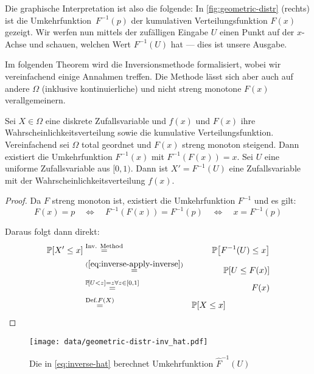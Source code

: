 Die graphische Interpretation ist also die folgende:
In \cref{fig:geometric-distr} (rechts) ist die Umkehrfunktion~$F^{-1}(p)$ der kumulativen Verteilungsfunktion $F(x)$ gezeigt.
Wir werfen nun mittels der zufälligen Eingabe $U$ einen Punkt auf der $x$-Achse und schauen, welchen Wert $F^{-1}(U)$ hat --- dies ist unsere Ausgabe.

Im folgenden Theorem wird die Inversionsmethode formalisiert, wobei wir vereinfachend einige Annahmen treffen.
Die Methode lässt sich aber auch auf andere $\Omega$ (inklusive kontinuierliche) und nicht streng monotone $F(x)$ verallgemeinern.

\begin{theorem}
    Sei $X \in \Omega$ eine diskrete Zufallsvariable und $f(x)$ und $F(x)$ ihre Wahrscheinlichkeitsverteilung sowie die kumulative Verteilungsfunktion.
    Vereinfachend sei $\Omega$ total geordnet und $F(x)$ streng monoton steigend.
    Dann existiert die Umkehrfunktion $F^{-1}(x)$ mit $F^{-1}(F(x)) = x$.
    Sei $U$ eine uniforme Zufallsvariable aus $[0, 1)$.
    Dann ist $X' = F^{-1}(U)$ eine Zufallsvariable mit der Wahrscheinlichkeitsverteilung $f(x)$.
\end{theorem}

\begin{proof}
    \noindent Da $F$ streng monoton ist, existiert die Umkehrfunktion $F^{-1}$ und es gilt:
    \begin{equation}\label{eq:inverse-apply-inverse}
        F(x) = p
        \quad\Leftrightarrow\quad F^{-1}(F(x)) = F^{-1}(p)
        \quad\Leftrightarrow\quad x = F^{-1}(p)
    \end{equation}

    \noindent Daraus folgt dann direkt:
    \begin{eqnarray}
        \prob{X' \le x} &\stackrel{\text{Inv. Method}} = & \prob{F^{-1}(U) \le x} \\
        &\stackrel{(\ref{eq:inverse-apply-inverse})}{=}& \prob{U \le F(x)} \\
        &\stackrel{\prob{U < z} = z \forall z \in [0, 1]}=& F(x) \\
        &\stackrel{\text{Def.} F(X)}=& \prob{X \le x} \hspace{5em}\hfill \qedhere
    \end{eqnarray}
\end{proof}

\bigskip
\bigskip

\begin{figure}
    \begin{center}
        \texttt{[image: data/geometric-distr-inv\_hat.pdf]}
    \end{center}
    \caption{Die in \cref{eq:inverse-hat} berechnet Umkehrfunktion $\hat F^{-1}(U)$}

\end{figure}

